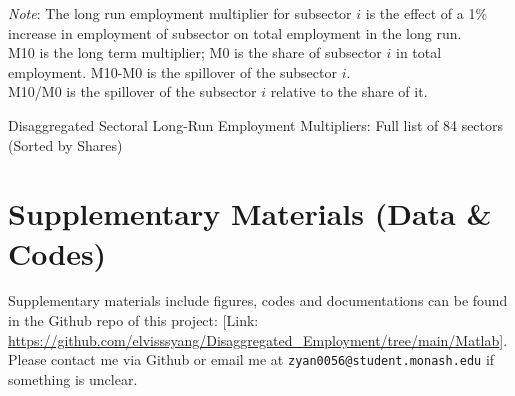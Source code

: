 \documentclass{monashthesis}
\begin{document}
\begin{table}[ht]
\begin{tablenotes}
      \item \emph{Note}: The long run employment multiplier for subsector $i$ is the effect of a 1\% increase in employment of subsector on total employment in the long run. \\
      M10 is the long term multiplier; M0 is the share of subsector $i$ in total employment.
      M10-M0 is the spillover of the subsector $i$. \\
      M10/M0 is the spillover of the subsector $i$ relative to the share of it.
\end{tablenotes}
\caption{Disaggregated Sectoral Long-Run Employment Multipliers: Full list of 84 sectors (Sorted by Shares)}
  \label{dis:emp}
\end{table}

\hypertarget{supplementary-materials-data-codes}{%
\chapter{Supplementary Materials (Data \& Codes)}\label{supplementary-materials-data-codes}}

Supplementary materials include figures, codes and documentations can be found in the Github repo of this project: {[}Link: \url{https://github.com/elvisssyang/Disaggregated_Employment/tree/main/Matlab}{]}. Please contact me via Github or email me at \texttt{zyan0056@student.monash.edu} if something is unclear.

\printbibliography[heading=bibintoc]
\end{document}
